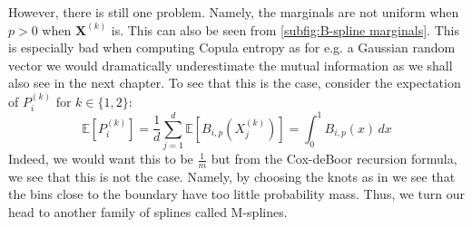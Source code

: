 \documentclass[../Thesis.tex]{subfiles}
\begin{document}
However, there is still one problem. Namely, the marginals are not uniform when $p > 0$ when $\boldsymbol X^{(k)}$ is. This can also be seen from \autoref{subfig:B-spline marginals}. This is especially bad when computing Copula entropy as for e.g. a Gaussian random vector we would dramatically underestimate the mutual information as we shall also see in the next chapter. To see that this is the case, consider the expectation of $P_i^{(k)}$ for $k\in \{1,2\}$:
$$\mathbb{E}\left[P_i^{(k)}\right] = \frac{1}{d} \sum_{j = 1}^{d}\mathbb{E}\left[B_{i,p}\left(X_j^{(k)}\right)\right] = \int_{0}^{1} B_{i,p}\left(x\right)\, dx$$
Indeed, we would want this to be $\frac{1}{m}$ but from the Cox-deBoor recursion formula, we see that this is not the case. Namely, by choosing the knots as in \cite{RePEc:plo:pbio00:0050008} we see that the bins close to the boundary have too little probability mass. Thus, we turn our head to another family of splines called M-splines.
\end{document}
